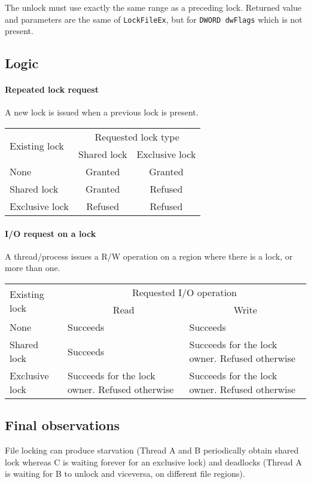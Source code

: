 The unlock must use exactly the same range as a preceding lock. Returned value and parameters are the same of \texttt{LockFileEx}, but for \texttt{DWORD dwFlags} which is not present.

\subsection{Logic}
\paragraph{Repeated lock request}
A new lock is issued when a previous lock is present.
\begin{center}
\begin{tabular}{|l|c|c|}
\hline 
\multirow{2}{*}{Existing lock} &  \multicolumn{2}{c|}{Requested lock type} \\\cline{2-3}
 & Shared lock & Exclusive lock \\
\hline 
None & Granted & Granted \\ 
\hline 
Shared lock & Granted & Refused \\ 
\hline 
Exclusive lock & Refused & Refused \\ 
\hline 
\end{tabular}
\end{center}

\paragraph{I/O request on a lock}
A thread/process issues a R/W operation on a region where there is a lock, or more than one.
\begin{center}
\begin{tabularx}{\textwidth}{|l|X|X|}
\hline 
\multirow{2}{*}{Existing lock} &  \multicolumn{2}{c|}{Requested I/O operation} \\\cline{2-3}
 & \multicolumn{1}{c|}{Read} & \multicolumn{1}{c|}{Write} \\
\hline 
None & Succeeds & Succeeds \\ 
\hline 
Shared lock & Succeeds & Succeeds for the lock owner. Refused otherwise \\ 
\hline 
Exclusive lock & Succeeds for the lock owner. Refused otherwise & Succeeds for the lock owner. Refused otherwise \\ 
\hline 
\end{tabularx}
\end{center}

\subsection{Final observations}
File locking can produce starvation (Thread A and B periodically obtain shared lock whereas C is waiting forever for an exclusive lock) and deadlocks (Thread A is waiting for B to unlock and viceversa, on different file regions).

